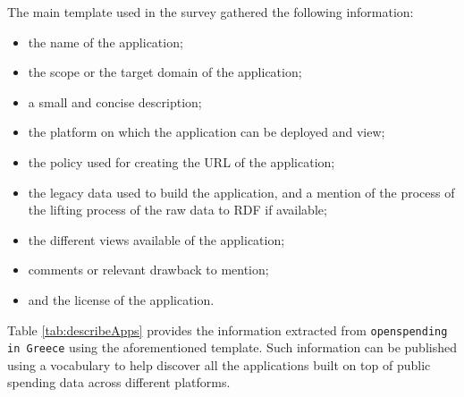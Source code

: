The main template used in the survey gathered the following information:
\begin{itemize}
\item the name of the application;
\item the scope or the target domain of the application;
\item a small and concise description;
\item the platform on which the application can be deployed and view;
\item the policy used for creating the URL of the application;
\item the legacy data used to build the application, and a mention of the process of the lifting process of the raw data to RDF if available;
\item the different views available of the application;
\item comments or relevant drawback to mention;
\item and the license of the application.
\end{itemize}
 Table \ref{tab:describeApps} provides the information extracted from \texttt{openspending in Greece} using the aforementioned template. Such information can be published using a vocabulary to help discover all the applications built on top of public spending data across different platforms.






